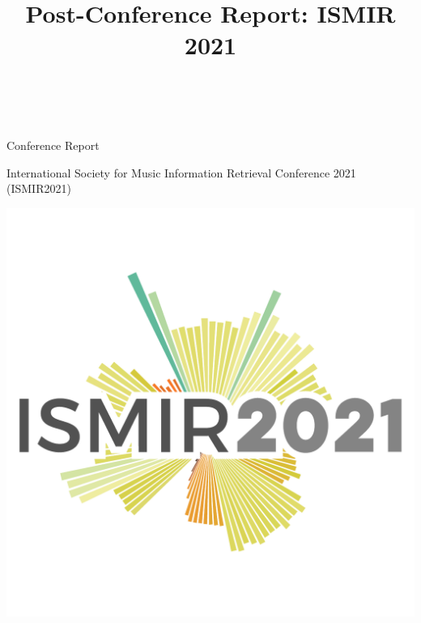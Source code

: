 \documentclass[%
10pt,								%
titlepage,						%
]
{scrartcl}
\begin{document}
\pagestyle{empty} %


\title{Post-Conference Report: ISMIR 2021}
\author{~}
\begin{titlepage}
    
    {\LARGE\normalfont\sectfont Conference Report}
    
    \vspace{.5cm}
    {\large\normalfont\sectfont International Society for Music Information Retrieval Conference 2021 (ISMIR2021)}

    \begin{center}
        \includegraphics[scale=.35]{fig/ISMIR2021_LOGO}
    \end{center}
    

\end{titlepage}
\end{document}

